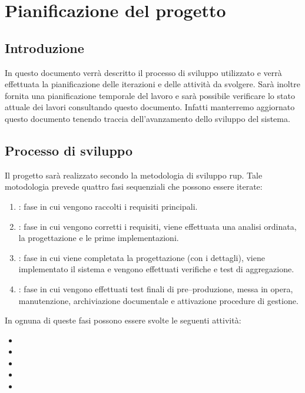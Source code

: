 \chapter{Pianificazione del progetto} 
\label{cha:pianificazione_del_progetto}	

\section{Introduzione}
In questo documento verrà descritto il processo di sviluppo utilizzato e verrà effettuata la pianificazione delle iterazioni e delle attività da svolgere.
Sarà inoltre fornita una pianificazione temporale del lavoro e sarà possibile verificare lo stato attuale dei lavori consultando questo documento. Infatti manterremo aggiornato questo documento tenendo traccia dell'avanzamento dello sviluppo del sistema.

\section{Processo di sviluppo}
\label{sec:processo_di_sviluppo}
Il progetto sarà realizzato secondo la metodologia di sviluppo \gls{rup}.
Tale motodologia prevede quattro fasi sequenziali che possono essere iterate:
\begin{enumerate}
	\item {}: fase in cui vengono raccolti i requisiti principali.

	\item {}: fase in cui vengono corretti i requisiti, viene effettuata una analisi ordinata, la progettazione e le prime implementazioni.

	\item {}: fase in cui viene completata la progettazione (con i dettagli), viene implementato il sistema e vengono effettuati verifiche e test di aggregazione.

	\item {}: fase in cui vengono effettuati test finali di pre--produzione, messa in opera, manutenzione, archiviazione documentale e attivazione procedure di gestione.
\end{enumerate}

\noindent
In ognuna di queste fasi possono essere svolte le seguenti attività:
\begin{itemize}
	\item {}
	\item {}
	\item {}
	\item {}
	\item {}
\end{itemize}

